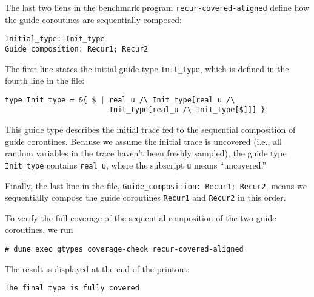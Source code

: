 The last two liens in the benchmark program \texttt{recur-covered-aligned}
define how the guide coroutines are sequentially composed:
\begin{verbatim}
Initial_type: Init_type
Guide_composition: Recur1; Recur2
\end{verbatim}
%
The first line states the initial guide type \texttt{Init\_type}, which is
defined in the fourth line in the file:
\begin{verbatim}
type Init_type = &{ $ | real_u /\ Init_type[real_u /\
                        Init_type[real_u /\ Init_type[$]]] }
\end{verbatim}
%
This guide type describes the initial trace fed to the sequential composition of
guide coroutines.
%
Because we assume the initial trace is uncovered (i.e., all random variables in
the trace haven't been freshly sampled), the guide type \texttt{Init\_type}
contains \texttt{real\_u}, where the subscript \texttt{u} means ``uncovered.''

Finally, the last line in the file, \texttt{Guide\_composition: Recur1; Recur2},
means we sequentially compose the guide coroutines \texttt{Recur1} and
\texttt{Recur2} in this order.

To verify the full coverage of the sequential composition of the two guide
coroutines, we run
\begin{verbatim}
# dune exec gtypes coverage-check recur-covered-aligned
\end{verbatim}
%
The result is displayed at the end of the printout:
\begin{verbatim}
The final type is fully covered
\end{verbatim}

